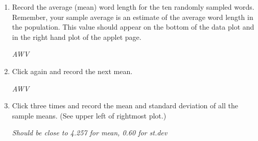 \begin{enumerate}
\begin{enumerate}
   \item  The text box should contain the joke data. If it does not,
     highlight all the text and delete it. Then go to D2L, load the
     joke text and paste it in here.
        Click . How many words does it say we have?
      \\(If it's not 421, something went wrong.)
     \item Draw one sample of 10 words.   Write 
       out the 10 word lengths in that sample.  
\begin{students}
  \vspace{2cm}
\end{students}    
\begin{key}
   {\it AWV }
\end{key}      
    \end{enumerate}
     \item  Record the average (mean) word length for the ten
       randomly sampled words. Remember, your sample average is an
       estimate of the average word length in the population.  This
       value should appear on the bottom of the data plot and in the
       right hand plot of the applet page.        
\begin{students}
  \vspace{1cm}
\end{students}    
\begin{key}
   {\it AWV}
\end{key}

     \item  Click   again and record the next
       mean.
\begin{students}
  \vspace{1cm}
\end{students}    
\begin{key}
   {\it AWV}
\end{key}
       

     \item \label{3000SRSs} Click   three
         times and record the mean and standard deviation of all the
         sample means. (See upper left of rightmost plot.)       
\begin{students}
  \vspace{1cm}
\end{students}    
\begin{key}
   {\it Should be close to 4.257 for mean, 0.60 for st.dev }
\end{key}
         


\end{enumerate}
